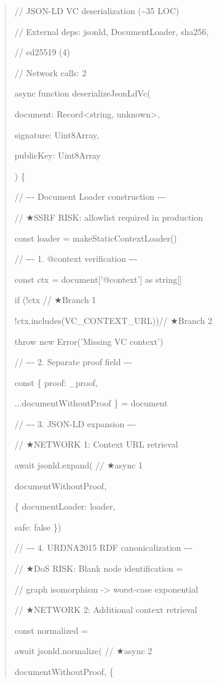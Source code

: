 \documentclass[conference]{IEEEtran}
\begin{document}
\begin{quote}
// JSON-LD VC deserialization (\textasciitilde35 LOC)

// External deps: jsonld, DocumentLoader, sha256,

// ed25519 (4)

// Network calls: 2

async function deserializeJsonLdVc(

document: Record\textless string, unknown\textgreater,

signature: Uint8Array,

publicKey: Uint8Array

) \{

// -\/-\/- Document Loader construction -\/-\/-

// ★SSRF RISK: allowlist required in production

const loader = makeStaticContextLoader()

// -\/-\/- 1. @context verification -\/-\/-

const ctx = document{[}'@context'{]} as string{[}{]}

if (!ctx \textbar\textbar{} // ★Branch 1

!ctx.includes(VC\_CONTEXT\_URL))// ★Branch 2

throw new Error('Missing VC context')

// -\/-\/- 2. Separate proof field -\/-\/-

const \{ proof: \_proof,

...documentWithoutProof \} = document

// -\/-\/- 3. JSON-LD expansion -\/-\/-

// ★NETWORK 1: Context URL retrieval

await jsonld.expand( // ★async 1

documentWithoutProof,

\{ documentLoader: loader,

safe: false \})

// -\/-\/- 4. URDNA2015 RDF canonicalization -\/-\/-

// ★DoS RISK: Blank node identification =

// graph isomorphism -\textgreater{} worst-case exponential

// ★NETWORK 2: Additional context retrieval

const normalized =

await jsonld.normalize( // ★async 2

documentWithoutProof, \{


\end{quote}
\end{document}
